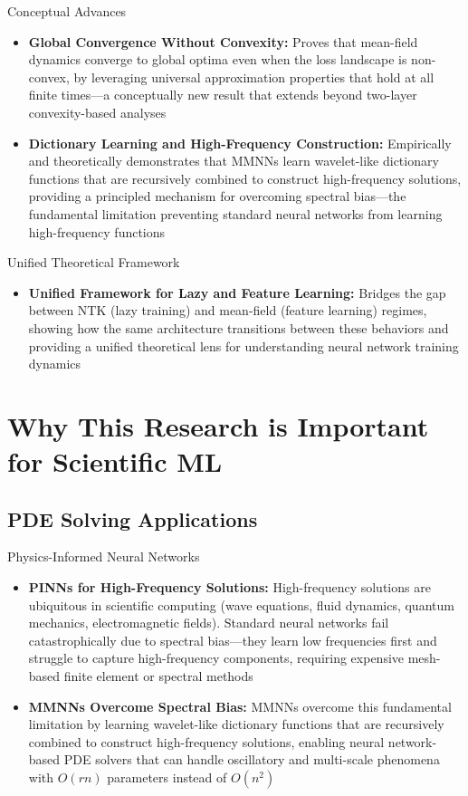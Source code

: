 \documentclass[aspectratio=169]{beamer}
\begin{document}
\begin{frame}{Conceptual Advances}
\begin{itemize}
\item \textbf{Global Convergence Without Convexity:} Proves that mean-field dynamics converge to global optima even when the loss landscape is non-convex, by leveraging universal approximation properties that hold at all finite times—a conceptually new result that extends beyond two-layer convexity-based analyses
\item \textbf{Dictionary Learning and High-Frequency Construction:} Empirically and theoretically demonstrates that MMNNs learn wavelet-like dictionary functions that are recursively combined to construct high-frequency solutions, providing a principled mechanism for overcoming spectral bias—the fundamental limitation preventing standard neural networks from learning high-frequency functions
\end{itemize}
\end{frame}

\begin{frame}{Unified Theoretical Framework}
\begin{itemize}
\item \textbf{Unified Framework for Lazy and Feature Learning:} Bridges the gap between NTK (lazy training) and mean-field (feature learning) regimes, showing how the same architecture transitions between these behaviors and providing a unified theoretical lens for understanding neural network training dynamics
\end{itemize}
\end{frame}

\section{Why This Research is Important for Scientific ML}

\subsection{PDE Solving Applications}

\begin{frame}{Physics-Informed Neural Networks}
\begin{itemize}
\item \textbf{PINNs for High-Frequency Solutions:} High-frequency solutions are ubiquitous in scientific computing (wave equations, fluid dynamics, quantum mechanics, electromagnetic fields). Standard neural networks fail catastrophically due to spectral bias—they learn low frequencies first and struggle to capture high-frequency components, requiring expensive mesh-based finite element or spectral methods
\item \textbf{MMNNs Overcome Spectral Bias:} MMNNs overcome this fundamental limitation by learning wavelet-like dictionary functions that are recursively combined to construct high-frequency solutions, enabling neural network-based PDE solvers that can handle oscillatory and multi-scale phenomena with $O(rn)$ parameters instead of $O(n^2)$
\end{itemize}
\end{frame}
\end{document}
